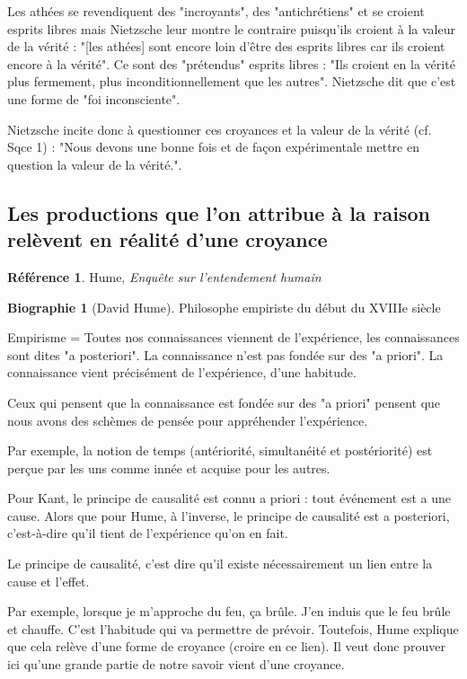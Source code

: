\documentclass[french]{book}
\theoremstyle{definition}
\newtheorem*{refe}{Référence}
\newtheorem*{bio}{Biographie}
\begin{document}
Les athées se revendiquent des "incroyants", des "antichrétiens" et se croient esprits libres mais Nietzsche leur montre le contraire puisqu'ils croient à la valeur de la vérité : "[les athées] sont encore loin d'être des esprits libres car ils croient encore à la vérité". Ce sont des "prétendus" esprits libres : "Ils croient en la vérité plus fermement, plus inconditionnellement que les autres". Nietzsche dit que c'est une forme de "foi inconsciente".

Nietzsche incite donc à questionner ces croyances et la valeur de la vérité (cf. Sqce 1) : "Nous devons une bonne fois et de façon expérimentale mettre en question la valeur de la vérité.".

\subsection{Les productions que l'on attribue à la raison relèvent en réalité d'une croyance}

\begin{refe}
	Hume, \textit{Enquête sur l'entendement humain}
\end{refe}

\begin{bio}[David Hume]
	Philosophe empiriste du début du XVIIIe siècle 
\end{bio}

Empirisme = Toutes nos connaissances viennent de l'expérience, les connaissances sont dites "a posteriori". La connaissance n'est pas fondée sur des "a priori". La connaissance vient précisément de l'expérience, d'une habitude.

Ceux qui pensent que la connaissance est fondée sur des "a priori" pensent que nous avons des schèmes de pensée pour appréhender l'expérience.

Par exemple, la notion de temps (antériorité, simultanéité et postériorité) est perçue par les uns comme innée et acquise pour les autres.

Pour Kant, le principe de causalité est connu a priori : tout événement est a une cause. Alors que pour Hume, à l'inverse, le principe de causalité est a posteriori, c'est-à-dire qu'il tient de l'expérience qu'on en fait.

Le principe de causalité, c'est dire qu'il existe nécessairement un lien entre la cause et l'effet.

Par exemple, lorsque je m'approche du feu, ça brûle. J'en induis que le feu brûle et chauffe. C'est l'habitude qui va permettre de prévoir. Toutefois, Hume explique que cela relève d'une forme de croyance (croire en ce lien). Il veut donc prouver ici qu'une grande partie de notre savoir vient d'une croyance.
\end{document}
